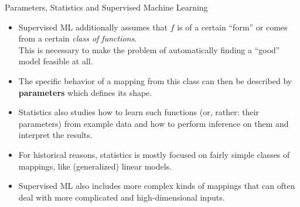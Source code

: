 \documentclass[11pt,compress,t,notes=noshow, xcolor=table]{beamer}
\begin{document}
\begin{vbframe}{Parameters, Statistics and Supervised Machine Learning}

\begin{itemize}
\item Supervised ML additionally assumes that $f$ is of a certain \enquote{form}
or comes from a certain \emph{class of functions}.\\
This is necessary to make the problem of automatically finding a \enquote{good} model feasible at all.
\item The specific behavior of a mapping from this class can then be described by \textbf{parameters} which defines its shape.
\item Statistics also studies how to learn such functions (or, rather: their parameters) from example data and how to perform inference on them and interpret the results.
\item For historical reasons, statistics is mostly focused on fairly simple classes of mappings, like (generalized) linear models.
\item Supervised ML also includes more complex kinds of mappings that can often deal with more complicated and high-dimensional inputs.
\end{itemize}
\end{vbframe}

\endlecture
\end{document}
